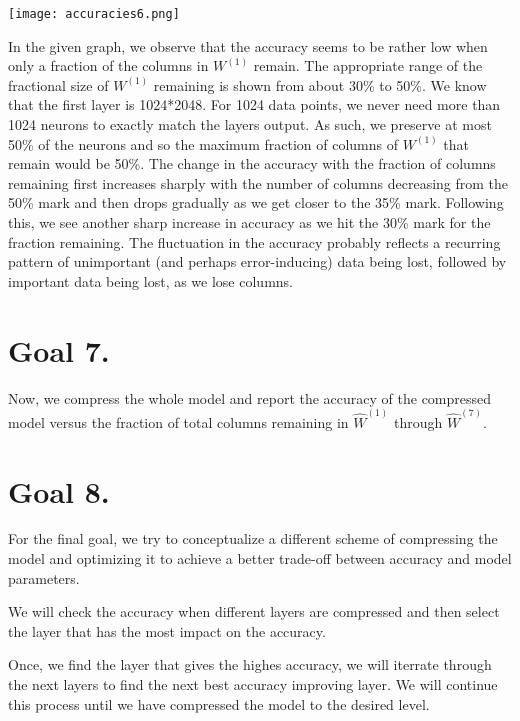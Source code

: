 \documentclass[12pt]{article}
\begin{document}
\begin{center}
    \texttt{[image: accuracies6.png]}
\end{center}
In the given graph, we observe that the accuracy seems to be rather low when only a fraction of the columns in $W^{(1)}$ remain. The appropriate range of the fractional size of $W^{(1)}$ remaining is shown from about 30\% to 50\%. We know that the first layer is 1024*2048. For 1024 data points, we never need more than 1024 neurons to exactly match the layers output. As such, we preserve at most 50\% of the neurons and so the maximum fraction of columns of $W^{(1)}$ that remain would be 50\%. 
The change in the accuracy with the fraction of columns remaining first increases sharply with the number of columns decreasing from the 50\% mark and then drops gradually as we get closer to the 35\% mark. Following this, we see another sharp increase in accuracy as we hit the 30\% mark for the fraction remaining. The fluctuation in the accuracy probably reflects a recurring pattern of unimportant (and perhaps error-inducing) data being lost, followed by important data being lost, as we lose columns.

\section*{Goal 7.}
Now, we compress the whole model and report the accuracy of the compressed model versus the fraction of total columns remaining in $\hat{W}^{(1)}$ through $\hat{W}^{(7)}$. 



\section*{Goal 8.}
For the final goal, we try to conceptualize a different scheme of compressing the model and optimizing it to achieve a better trade-off between accuracy and model parameters.


We will check the accuracy when different layers are compressed and then select the layer that has the most impact on the accuracy.

Once, we find the layer that gives the highes accuracy, we will iterrate through the next layers to find the next best accuracy improving layer. We will continue this process until we have compressed the model to the desired level.
\end{document}
